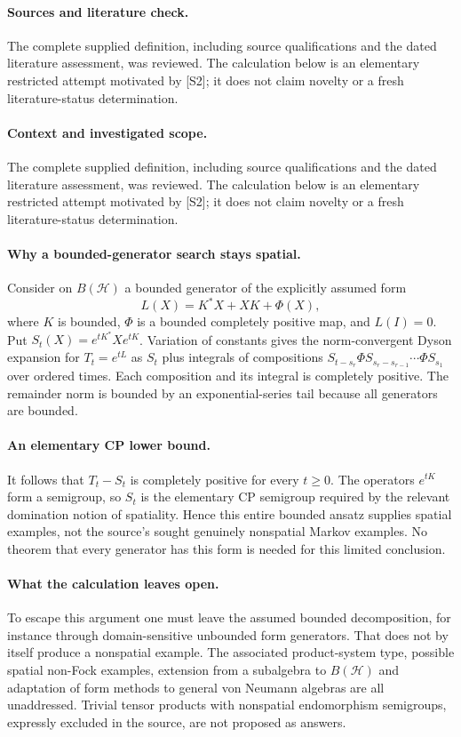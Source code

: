 \documentclass[11pt]{article}
\begin{document}
\paragraph{Sources and literature check.}
The complete supplied definition, including source qualifications and the dated literature assessment, was reviewed. The calculation below is an elementary restricted attempt motivated by [S2]; it does not claim novelty or a fresh literature-status determination.

\paragraph{Context and investigated scope.} The complete supplied definition, including source qualifications and the dated literature assessment, was reviewed. The calculation below is an elementary restricted attempt motivated by [S2]; it does not claim novelty or a fresh literature-status determination.

\paragraph{Why a bounded-generator search stays spatial.} Consider on $B(\mathcal H)$ a bounded generator of the explicitly assumed form
\[
 L(X)=K^*X+XK+\Phi(X),
\]
where $K$ is bounded, $\Phi$ is a bounded completely positive map, and $L(I)=0$. Put $S_t(X)=e^{tK^*}Xe^{tK}$. Variation of constants gives the norm-convergent Dyson expansion for $T_t=e^{tL}$ as $S_t$ plus integrals of compositions $S_{t-s_r}\Phi S_{s_r-s_{r-1}}\cdots\Phi S_{s_1}$ over ordered times. Each composition and its integral is completely positive. The remainder norm is bounded by an exponential-series tail because all generators are bounded.

\paragraph{An elementary CP lower bound.} It follows that $T_t-S_t$ is completely positive for every $t\geq0$. The operators $e^{tK}$ form a semigroup, so $S_t$ is the elementary CP semigroup required by the relevant domination notion of spatiality. Hence this entire bounded ansatz supplies spatial examples, not the source's sought genuinely nonspatial Markov examples. No theorem that every generator has this form is needed for this limited conclusion.

\paragraph{What the calculation leaves open.} To escape this argument one must leave the assumed bounded decomposition, for instance through domain-sensitive unbounded form generators. That does not by itself produce a nonspatial example. The associated product-system type, possible spatial non-Fock examples, extension from a subalgebra to $B(\mathcal H)$ and adaptation of form methods to general von Neumann algebras are all unaddressed. Trivial tensor products with nonspatial endomorphism semigroups, expressly excluded in the source, are not proposed as answers.
\end{document}
